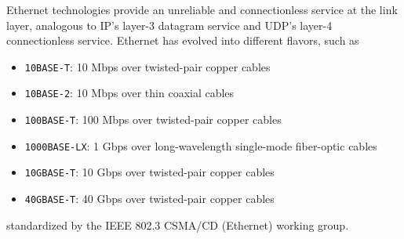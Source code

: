 \noindent Ethernet technologies provide an unreliable and connectionless service at the link layer, analogous to IP's layer-3 datagram service and UDP's layer-4 connectionless service. Ethernet has evolved into different flavors, such as
\begin{itemize}[nolistsep,noitemsep,label=--]\small
    \item \texttt{10BASE-T}: 10 Mbps over twisted-pair copper cables
    \item \texttt{10BASE-2}: 10 Mbps over thin coaxial cables
    \item \texttt{100BASE-T}: 100 Mbps over twisted-pair copper cables
    \item \texttt{1000BASE-LX}: 1 Gbps over long-wavelength single-mode fiber-optic cables
    \item \texttt{10GBASE-T}: 10 Gbps over twisted-pair copper cables
    \item \texttt{40GBASE-T}: 40 Gbps over twisted-pair copper cables
\end{itemize}
standardized by the IEEE 802.3 CSMA/CD (Ethernet) working group.

